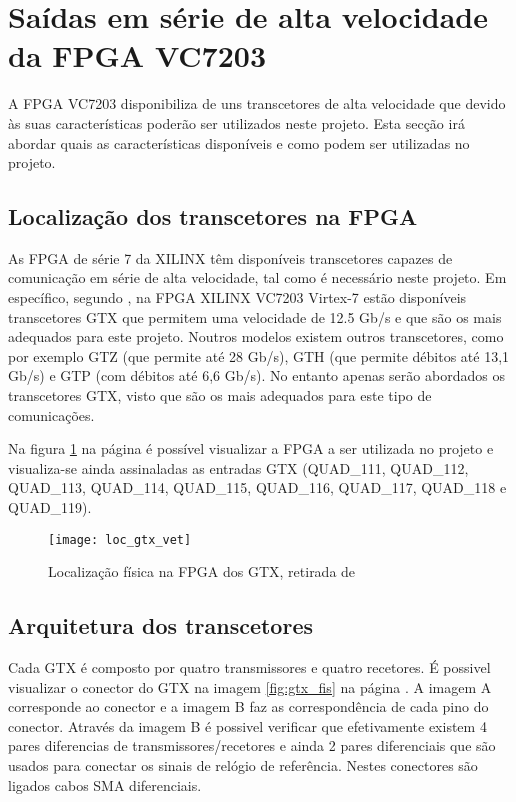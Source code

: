 \section{Saídas em série de alta velocidade da FPGA VC7203}

A FPGA VC7203 disponibiliza de uns transcetores de alta velocidade que devido às suas características poderão ser utilizados neste projeto. Esta secção irá abordar quais as características disponíveis e como podem ser utilizadas no projeto.


\subsection{Localização dos transcetores na FPGA}

As FPGA de série 7 da XILINX têm disponíveis transcetores capazes de comunicação em série de alta velocidade, tal como é necessário neste projeto. Em específico, segundo \cite{R010}, na FPGA XILINX VC7203 Virtex-7 estão disponíveis transcetores GTX que permitem uma velocidade de 12.5 Gb/s e que são os mais adequados para este projeto. Noutros modelos existem outros transcetores, como por exemplo GTZ (que permite até 28 Gb/s), GTH (que permite débitos até 13,1 Gb/s) e GTP (com débitos até 6,6 Gb/s). No entanto apenas serão abordados os transcetores GTX, visto que são os mais adequados para este tipo de comunicações.

Na figura \ref{fig:loc_gtx} na página \pageref{fig:loc_gtx} é possível visualizar a FPGA a ser utilizada no projeto e visualiza-se ainda assinaladas as entradas GTX (QUAD\_111, QUAD\_112, QUAD\_113, QUAD\_114, QUAD\_115, QUAD\_116, QUAD\_117, QUAD\_118 e QUAD\_119).
 
\begin{figure}[h!]
	\begin{center}
		\leavevmode
		\texttt{[image: loc\_gtx\_vet]}
		\caption{Localização física na FPGA dos GTX, retirada de \cite{R008}}
		\label{fig:loc_gtx}
	\end{center}
\end{figure}

\subsection{Arquitetura dos transcetores} \label{sub:arqGTX}

Cada GTX é composto por quatro transmissores e quatro recetores. É possivel visualizar o conector do GTX na imagem \ref{fig:gtx_fis} na página \pageref{fig:gtx_fis}. A imagem A corresponde ao conector e a imagem B faz as correspondência de cada pino do conector. Através da imagem B é possivel verificar que efetivamente existem 4 pares diferencias de transmissores/recetores e ainda 2 pares diferenciais que são usados para conectar os sinais de relógio de referência. Nestes conectores são ligados cabos SMA diferenciais.

